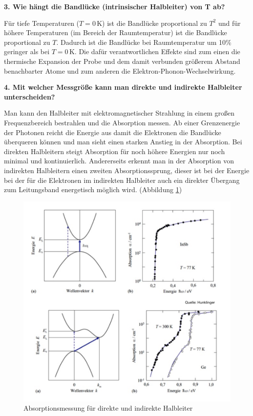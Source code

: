 \noindent\textbf{3. Wie hängt die Bandlücke (intrinsischer Halbleiter) von T ab?}\\
\begin{addmargin}[25pt]{0pt}
Für tiefe Temperaturen ($T=0$\,K) ist die Bandlücke proportional zu $T^2$ und für höhere Temperaturen (im Bereich der Raumtemperatur) ist die Bandlücke proportional zu $T$. Dadurch ist die Bandlücke bei Raumtemperatur um 10\% geringer als bei $T=0$\,K. Die dafür verantwortlichen Effekte sind zum einen die thermische Expansion der Probe und dem damit verbunden größerem Abstand benachbarter Atome und zum anderen die Elektron-Phonon-Wechselwirkung.\\
\end{addmargin}

\noindent\textbf{4. Mit welcher Messgröße kann man direkte und indirekte Halbleiter unterscheiden?}\\
\begin{addmargin}[25pt]{0pt}
Man kann den Halbleiter mit elektromagnetischer Strahlung in einem großen Frequenzbereich bestrahlen und die Absorption messen. Ab einer Grenzenergie der Photonen reicht die Energie aus damit die Elektronen die Bandlücke überqueren können und man sieht einen starken Anstieg in der Absorption. Bei direkten Halbleitern steigt Absorption für noch höhere Energien nur noch minimal und kontinuierlich. Andererseits erkennt man in der Absorption von indirekten Halbleitern einen zweiten Absorptionssprung, dieser ist bei der Energie bei der für die Elektronen im indirekten Halbleiter auch ein direkter Übergang zum Leitungsband energetisch möglich wird. (Abbildung \ref{fig:Absorption_HL})\\
\begin{figure}[h]
    \centering
    \includegraphics[scale = 0.8]{images/KM2/Absorption_HL.png}
    \caption{Absorptionsmessung für direkte und indirekte Halbleiter}
    \label{fig:Absorption_HL}
\end{figure}
\end{addmargin}

